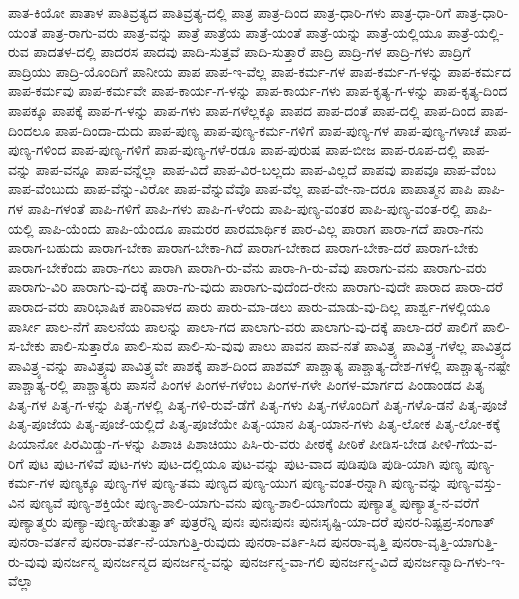 {ಪಾತ-ಕಿಯೋ
ಪಾತಾಳ
ಪಾತಿವ್ರತ್ಯದ
ಪಾತಿವ್ರತ್ಯ-ದಲ್ಲಿ
ಪಾತ್ರ
ಪಾತ್ರ-ದಿಂದ
ಪಾತ್ರ-ಧಾರಿ-ಗಳು
ಪಾತ್ರ-ಧಾ-ರಿಗೆ
ಪಾತ್ರ-ಧಾರಿ-ಯಂತೆ
ಪಾತ್ರ-ರಾಗು-ವರು
ಪಾತ್ರ-ವನ್ನು
ಪಾತ್ರೆ
ಪಾತ್ರೆಯ
ಪಾತ್ರೆ-ಯಂತೆ
ಪಾತ್ರೆ-ಯನ್ನು
ಪಾತ್ರೆ-ಯಲ್ಲಿಯೂ
ಪಾತ್ರೆ-ಯಲ್ಲಿ-ರುವ
ಪಾದತಳ-ದಲ್ಲಿ
ಪಾದರಸ
ಪಾದವು
ಪಾದಿ-ಸುತ್ತವೆ
ಪಾದಿ-ಸುತ್ತಾರೆ
ಪಾದ್ರಿ
ಪಾದ್ರಿ-ಗಳ
ಪಾದ್ರಿ-ಗಳು
ಪಾದ್ರಿಗೆ
ಪಾದ್ರಿಯು
ಪಾದ್ರಿ-ಯೊಂದಿಗೆ
ಪಾನೀಯ
ಪಾಪ
ಪಾಪ-ಇ-ವೆಲ್ಲ
ಪಾಪ-ಕರ್ಮ-ಗಳ
ಪಾಪ-ಕರ್ಮ-ಗ-ಳನ್ನು
ಪಾಪ-ಕರ್ಮದ
ಪಾಪ-ಕರ್ಮವು
ಪಾಪ-ಕರ್ಮವೇ
ಪಾಪ-ಕಾರ್ಯ-ಗ-ಳನ್ನು
ಪಾಪ-ಕಾರ್ಯ-ಗಳು
ಪಾಪ-ಕೃತ್ಯ-ಗ-ಳನ್ನು
ಪಾಪ-ಕೃತ್ಯ-ದಿಂದ
ಪಾಪಕ್ಕೂ
ಪಾಪಕ್ಕೆ
ಪಾಪ-ಗ-ಳನ್ನು
ಪಾಪ-ಗಳು
ಪಾಪ-ಗಳೆಲ್ಲಕ್ಕೂ
ಪಾಪದ
ಪಾಪ-ದಂತೆ
ಪಾಪ-ದಲ್ಲಿ
ಪಾಪ-ದಿಂದ
ಪಾಪ-ದಿಂದಲೂ
ಪಾಪ-ದಿಂದಾ-ದುದು
ಪಾಪ-ಪುಣ್ಯ
ಪಾಪ-ಪುಣ್ಯ-ಕರ್ಮ-ಗಳಿಗೆ
ಪಾಪ-ಪುಣ್ಯ-ಗಳ
ಪಾಪ-ಪುಣ್ಯ-ಗಳಾಚೆ
ಪಾಪ-ಪುಣ್ಯ-ಗಳಿಂದ
ಪಾಪ-ಪುಣ್ಯ-ಗಳಿಗೆ
ಪಾಪ-ಪುಣ್ಯ-ಗಳೆ-ರಡೂ
ಪಾಪ-ಪುರುಷ
ಪಾಪ-ಬೀಜ
ಪಾಪ-ರೂಪ-ದಲ್ಲಿ
ಪಾಪ-ವನ್ನು
ಪಾಪ-ವನ್ನೂ
ಪಾಪ-ವನ್ನೆಲ್ಲಾ
ಪಾಪ-ವಿದೆ
ಪಾಪ-ವಿರ-ಬಲ್ಲದು
ಪಾಪ-ವಿಲ್ಲದೆ
ಪಾಪವು
ಪಾಪವೂ
ಪಾಪ-ವೆಂಬ
ಪಾಪ-ವೆಂಬುದು
ಪಾಪ-ವೆನ್ನು-ವಿರೋ
ಪಾಪ-ವೆನ್ನುವೆವೊ
ಪಾಪ-ವೆಲ್ಲ
ಪಾಪ-ವೇ-ನಾ-ದರೂ
ಪಾಪಾತ್ಮನ
ಪಾಪಿ
ಪಾಪಿ-ಗಳ
ಪಾಪಿ-ಗಳಂತೆ
ಪಾಪಿ-ಗಳಿಗೆ
ಪಾಪಿ-ಗಳು
ಪಾಪಿ-ಗ-ಳೆಂದು
ಪಾಪಿ-ಪುಣ್ಯ-ವಂತರ
ಪಾಪಿ-ಪುಣ್ಯ-ವಂತ-ರಲ್ಲಿ
ಪಾಪಿ-ಯಲ್ಲಿ
ಪಾಪಿ-ಯೆಂದು
ಪಾಪಿ-ಯೆಂದೂ
ಪಾಮರರ
ಪಾರಮಾರ್ಥಿಕ
ಪಾರ-ವಿಲ್ಲ
ಪಾರಾಗ
ಪಾರಾ-ಗದೆ
ಪಾರಾ-ಗನು
ಪಾರಾಗ-ಬಹುದು
ಪಾರಾಗ-ಬೇಕಾ
ಪಾರಾಗ-ಬೇಕಾ-ಗಿದೆ
ಪಾರಾಗ-ಬೇಕಾದ
ಪಾರಾಗ-ಬೇಕಾ-ದರೆ
ಪಾರಾಗ-ಬೇಕು
ಪಾರಾಗ-ಬೇಕೆಂದು
ಪಾರಾ-ಗಲು
ಪಾರಾಗಿ
ಪಾರಾಗಿ-ರು-ವೆನು
ಪಾರಾ-ಗಿ-ರು-ವೆವು
ಪಾರಾಗು-ವನು
ಪಾರಾಗು-ವರು
ಪಾರಾಗು-ವಿರಿ
ಪಾರಾಗು-ವು-ದಕ್ಕೆ
ಪಾರಾ-ಗು-ವುದು
ಪಾರಾಗು-ವುದೆಂದ-ರೇನು
ಪಾರಾಗು-ವುದೇ
ಪಾರಾದ
ಪಾರಾ-ದರೆ
ಪಾರಾದ-ವರು
ಪಾರಿಭಾಷಿಕ
ಪಾರಿವಾಳದ
ಪಾರು
ಪಾರು-ಮಾ-ಡಲು
ಪಾರು-ಮಾಡು-ವು-ದಿಲ್ಲ
ಪಾರ್ಶ್ವ-ಗಳಲ್ಲಿಯೂ
ಪಾರ್ಸೀ
ಪಾಲ-ನೆಗೆ
ಪಾಲನೆಯ
ಪಾಲನ್ನು
ಪಾಲಾ-ಗದ
ಪಾಲಾಗು-ವರು
ಪಾಲಾಗು-ವು-ದಕ್ಕೆ
ಪಾಲಾ-ದರೆ
ಪಾಲಿಗೆ
ಪಾಲಿ-ಸ-ಬೇಕು
ಪಾಲಿ-ಸುತ್ತಾರೊ
ಪಾಲಿ-ಸುವ
ಪಾಲಿ-ಸು-ವುವು
ಪಾಲು
ಪಾವನ
ಪಾವ-ನತೆ
ಪಾವಿತ್ರ್ಯ
ಪಾವಿತ್ರ್ಯ-ಗಳೆಲ್ಲ
ಪಾವಿತ್ರ್ಯದ
ಪಾವಿತ್ರ್ಯ-ವನ್ನು
ಪಾವಿತ್ರ್ಯವು
ಪಾವಿತ್ರ್ಯವೇ
ಪಾಶಕ್ಕೆ
ಪಾಶ-ದಿಂದ
ಪಾಶಮ್
ಪಾಶ್ಚಾತ್ಯ
ಪಾಶ್ಚಾತ್ಯ-ದೇಶ-ಗಳಲ್ಲಿ
ಪಾಶ್ಚಾತ್ಯ-ನಷ್ಟೇ
ಪಾಶ್ಚಾತ್ಯ-ರಲ್ಲಿ
ಪಾಶ್ಚಾತ್ಯರು
ಪಾಸನೆ
ಪಿಂಗಳ
ಪಿಂಗಳ-ಗಳೆಂಬ
ಪಿಂಗಳ-ಗಳೇ
ಪಿಂಗಳ-ಮಾರ್ಗದ
ಪಿಂಡಾಂಡದ
ಪಿತೃ
ಪಿತೃ-ಗಳ
ಪಿತೃ-ಗ-ಳನ್ನು
ಪಿತೃ-ಗಳಲ್ಲಿ
ಪಿತೃ-ಗಳಿ-ರುವೆ-ಡೆಗೆ
ಪಿತೃ-ಗಳು
ಪಿತೃ-ಗಳೊಂದಿಗೆ
ಪಿತೃ-ಗಳೊ-ಡನೆ
ಪಿತೃ-ಪೂಜೆ
ಪಿತೃ-ಪೂಜೆಯ
ಪಿತೃ-ಪೂಜೆ-ಯಲ್ಲಿದೆ
ಪಿತೃ-ಪೂಜೆಯೇ
ಪಿತೃ-ಯಾನ
ಪಿತೃ-ಯಾನ-ಗಳು
ಪಿತೃ-ಲೋಕ
ಪಿತೃ-ಲೋ-ಕಕ್ಕೆ
ಪಿಯಾನೋ
ಪಿರಮಿಡ್ಡು-ಗ-ಳನ್ನು
ಪಿಶಾಚಿ
ಪಿಶಾಚಿಯು
ಪಿಸಿ-ರು-ವರು
ಪೀಠಕ್ಕೆ
ಪೀಠಿಕೆ
ಪೀಡಿಸ-ಬೇಡ
ಪೀಳಿ-ಗೆಯ-ವ-ರಿಗೆ
ಪುಟ
ಪುಟ-ಗಳಿವೆ
ಪುಟ-ಗಳು
ಪುಟ-ದಲ್ಲಿಯೂ
ಪುಟ-ವನ್ನು
ಪುಟ-ವಾದ
ಪುಡಿಪುಡಿ
ಪುಡಿ-ಯಾಗಿ
ಪುಣ್ಯ
ಪುಣ್ಯ-ಕರ್ಮ-ಗಳ
ಪುಣ್ಯಕ್ಕೂ
ಪುಣ್ಯ-ಗಳ
ಪುಣ್ಯ-ತಮ
ಪುಣ್ಯದ
ಪುಣ್ಯ-ಯುಗ
ಪುಣ್ಯ-ವಂತ-ರನ್ನಾಗಿ
ಪುಣ್ಯ-ವನ್ನು
ಪುಣ್ಯ-ವಸ್ತು-ವಿನ
ಪುಣ್ಯವೆ
ಪುಣ್ಯ-ಶಕ್ತಿಯೇ
ಪುಣ್ಯ-ಶಾಲಿ-ಯಾಗು-ವನು
ಪುಣ್ಯ-ಶಾಲಿ-ಯಾಗೆಂದು
ಪುಣ್ಯಾತ್ಮ
ಪುಣ್ಯಾತ್ಮ-ನ-ವರೆಗೆ
ಪುಣ್ಯಾತ್ಮರು
ಪುಣ್ಯಾ-ಪುಣ್ಯ-ಹೇತುತ್ವಾತ್
ಪುತ್ರರೆನ್ನಿ
ಪುನಃ
ಪುನಃಪುನಃ
ಪುನಃಸೃಷ್ಟಿ-ಯಾ-ದರೆ
ಪುನರ-ನಿಷ್ಟಪ್ರ-ಸಂಗಾತ್
ಪುನರಾ-ವರ್ತನೆ
ಪುನರಾ-ವರ್ತ-ನೆ-ಯಾಗುತ್ತಿ-ರುವುದು
ಪುನರಾ-ವರ್ತಿ-ಸಿದ
ಪುನರಾ-ವೃತ್ತಿ
ಪುನರಾ-ವೃತ್ತಿ-ಯಾಗುತ್ತಿ-ರು-ವುವು
ಪುನರ್ಜನ್ಮ
ಪುನರ್ಜನ್ಮದ
ಪುನರ್ಜನ್ಮ-ವನ್ನು
ಪುನರ್ಜನ್ಮ-ವಾ-ಗಲಿ
ಪುನರ್ಜನ್ಮ-ವಿದೆ
ಪುನರ್ಜನ್ಮಾದಿ-ಗಳು-ಇ-ವೆಲ್ಲಾ
}
